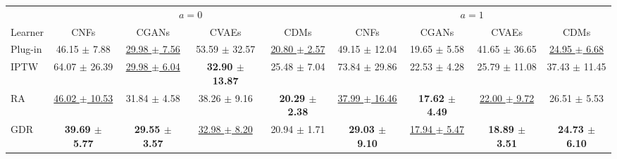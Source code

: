 \begin{tabu}{l|cccc|cccc}
\toprule
 &  &  \\
Learner & CNFs & CGANs & CVAEs & CDMs & CNFs & CGANs & CVAEs & CDMs \\
\midrule
Plug-in & 46.15 $\pm$ 7.88 & \underline{29.98 $\pm$ 7.56} & 53.59 $\pm$ 32.57 & \underline{20.80 $\pm$ 2.57} & 49.15 $\pm$ 12.04 & 19.65 $\pm$ 5.58 & 41.65 $\pm$ 36.65 & \underline{24.95 $\pm$ 6.68} \\
IPTW & 64.07 $\pm$ 26.39 & \underline{29.98 $\pm$ 6.04} & \textbf{32.90 $\pm$ 13.87} & 25.48 $\pm$ 7.04 & 73.84 $\pm$ 29.86 & 22.53 $\pm$ 4.28 & 25.79 $\pm$ 11.08 & 37.43 $\pm$ 11.45 \\
RA & \underline{46.02 $\pm$ 10.53} & 31.84 $\pm$ 4.58 & 38.26 $\pm$ 9.16 & \textbf{20.29 $\pm$ 2.38} & \underline{37.99 $\pm$ 16.46} & \textbf{17.62 $\pm$ 4.49} & \underline{22.00 $\pm$ 9.72} & 26.51 $\pm$ 5.53 \\
GDR & \textbf{39.69 $\pm$ 5.77} & \textbf{29.55 $\pm$ 3.57} & \underline{32.98 $\pm$ 8.20} & 20.94 $\pm$ 1.71 & \textbf{29.03 $\pm$ 9.10} & \underline{17.94 $\pm$ 5.47} & \textbf{18.89 $\pm$ 3.51} & \textbf{24.73 $\pm$ 6.10} \\
\bottomrule
\end{tabu}

